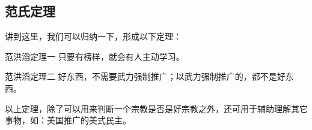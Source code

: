\subsection{范氏定理}

讲到这里，我们可以归纳一下，形成以下定理：

\begin{itembox}[l]{范洪滔定理一}
    只要有榜样，就会有人主动学习。
\end{itembox}

\begin{itembox}[l]{范洪滔定理二}
    好东西，不需要武力强制推广；以武力强制推广的，都不是好东西。
\end{itembox}

以上定理，除了可以用来判断一个宗教是否是好宗教之外，还可用于辅助理解其它事物，如：美国推广的美式民主。


